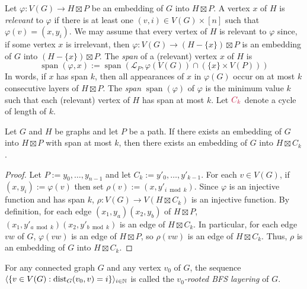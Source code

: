 \documentclass{patmorin}
\makeatletter
\newcommand{\defin}[1]{\emph{\textcolor{brightmaroon}{#1}}}
\def\mathcolor#1#{\@mathcolor{#1}}
\def\@mathcolor#1#2#3{%
  \protect\leavevmode
  \begingroup
    \color#1{#2}#3%
  \endgroup
}
\newcommand{\mathdefin}[1]{\mathcolor{brightmaroon}{#1}}
\DeclareMathOperator{\spn}{span}
\DeclareMathOperator{\dist}{dist}
\makeatother
\begin{document}
Let $\varphi:V(G)\to H\boxtimes P$ be an embedding of $G$ into $H\boxtimes P$. A vertex $x$ of $H$ is \defin{relevant} to $\varphi$ if there is at least one $(v,i)\in V(G)\times [n]$ such that $\varphi(v)=(x,y_i)$.  We may assume that every vertex of $H$ is relevant to $\varphi$ since, if some vertex $x$ is irrelevant, then $\varphi:V(G)\to (H-\{x\})\boxtimes P$ is an embedding of $G$ into $(H-\{x\})\boxtimes P$. The \defin{span} of a (relevant) vertex $x$ of $H$ is
\[
  \spn(\varphi,x):=\spn(\mathcal{L}_P, \varphi(V(G))\cap (\{x\}\times V(P)))
\]
In words, if $x$ has span $k$, then all appearances of $x$ in $\varphi(G)$ occur on at most $k$ consecutive layers of $H\boxtimes P$.  The \defin{span} $\spn(\varphi)$ of $\varphi$ is the minimum value $k$ such that each (relevant) vertex of $H$ has span at most $k$.  Let $\mathdefin{C_k}$ denote a cycle of length of $k$.

\begin{lem}
  Let $G$ and $H$ be graphs and let $P$ be a path.  If there exists an embedding of $G$ into $H\boxtimes P$ with span at most $k$, then there exists an embedding of $G$ into $H\boxtimes C_k$.
\end{lem}

\begin{proof}
  Let $P:=y_0,\ldots,y_{n-1}$ and let $C_k:=y'_0,\ldots,y'_{k-1}$.  For each $v\in V(G)$, if $(x,y_i):=\varphi(v)$ then set $\rho(v):=(x,y'_{i\bmod k})$.  Since $\varphi$ is an injective function and has span $k$, $\rho:V(G)\to V(H\boxtimes C_k)$ is an injective function. By definition, for each edge $(x_1,y_{a})(x_2,y_b)$ of $H\boxtimes P$,  $(x_1,y'_{a\bmod k})(x_2,y'_{b\bmod k})$ is an edge of $H\boxtimes C_k$.  In particular, for each edge $vw$ of $G$, $\varphi(vw)$ is an edge of $H\boxtimes P$, so $\rho(vw)$ is an edge of $H\boxtimes C_k$.  Thus, $\rho$ is an embedding of $G$ into $H\boxtimes C_k$.
\end{proof}

For any connected graph $G$ and any vertex $v_0$ of $G$, the sequence $\langle \{v\in V(G):\dist_G(v_0,v)=i\}\rangle_{i\in\N}$ is called the \defin{$v_0$-rooted BFS layering} of $G$.
\end{document}
